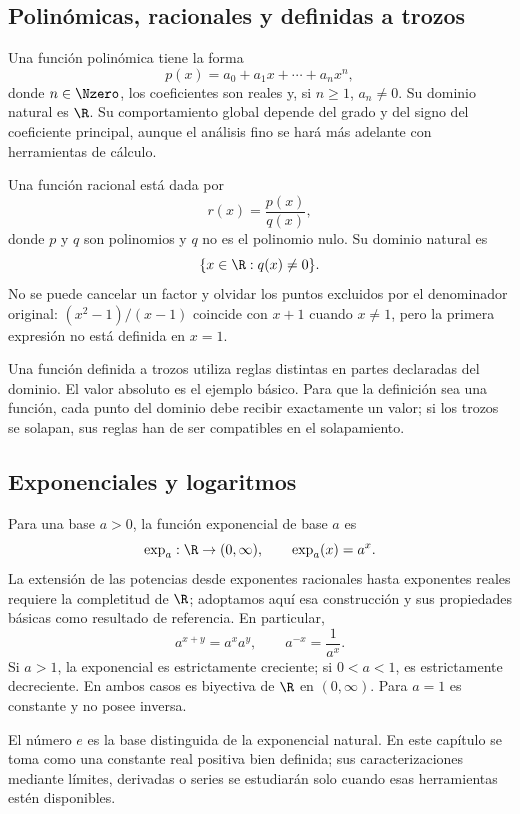 \subsection{Polinómicas, racionales y definidas a trozos}

Una función polinómica tiene la forma
\[
  p(x)=a_0+a_1x+\cdots+a_nx^n,
\]
donde \(n\in\Nzero\), los coeficientes son reales y, si \(n\ge1\),
\(a_n\ne0\). Su dominio natural es \(\R\). Su comportamiento global depende
del grado y del signo del coeficiente principal, aunque el análisis fino se
hará más adelante con herramientas de cálculo.

Una función racional está dada por
\[
  r(x)=\frac{p(x)}{q(x)},
\]
donde \(p\) y \(q\) son polinomios y \(q\) no es el polinomio nulo. Su dominio
natural es
\[
  \{x\in\R:q(x)\ne0\}.
\]
No se puede cancelar un factor y olvidar los puntos excluidos por el
denominador original: \((x^2-1)/(x-1)\) coincide con \(x+1\) cuando
\(x\ne1\), pero la primera expresión no está definida en \(x=1\).

Una función definida a trozos utiliza reglas distintas en partes declaradas
del dominio. El valor absoluto es el ejemplo básico. Para que la definición
sea una función, cada punto del dominio debe recibir exactamente un valor; si
los trozos se solapan, sus reglas han de ser compatibles en el solapamiento.

\subsection{Exponenciales y logaritmos}

Para una base \(a>0\), la función exponencial de base \(a\) es
\[
  \exp_a:\R\to(0,\infty), \qquad \exp_a(x)=a^x.
\]
La extensión de las potencias desde exponentes racionales hasta exponentes
reales requiere la completitud de \(\R\); adoptamos aquí esa construcción y
sus propiedades básicas como resultado de referencia. En particular,
\[
  a^{x+y}=a^x a^y, \qquad a^{-x}=\frac1{a^x}.
\]
Si \(a>1\), la exponencial es estrictamente creciente; si \(0<a<1\), es
estrictamente decreciente. En ambos casos es biyectiva de \(\R\) en
\((0,\infty)\). Para \(a=1\) es constante y no posee inversa.

El número \(e\) es la base distinguida de la exponencial natural. En este
capítulo se toma como una constante real positiva bien definida; sus
caracterizaciones mediante límites, derivadas o series se estudiarán solo
cuando esas herramientas estén disponibles.

